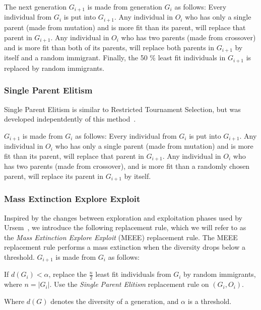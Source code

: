 The next generation $G_{i+1}$ is made from generation $G_i$ as follows:
Every individual from $G_i$ is put into $G_{i+1}$.
Any individual in $O_i$ who has only a single parent (made from mutation) and is more fit than its parent, will replace that parent in $G_{i+1}$.
Any individual in $O_i$ who has two parents (made from crossover) and is more fit than both of its parents, will replace both parents in $G_{i+1}$ by itself and a random immigrant.
Finally, the 50 \% least fit individuals in $G_{i+1}$ is replaced by random immigrants.


\subsubsection{Single Parent Elitism}
Single Parent Elitism is similar to Restricted Tournament Selection, but was developed indepentdently of this method~\cite[p. 132]{Luke2013Metaheuristics}.

$G_{i+1}$ is made from $G_i$ as follows:
Every individual from $G_i$ is put into $G_{i+1}$.
Any individual in $O_i$ who has only a single parent (made from mutation) and is more fit than its parent, will replace that parent in $G_{i+1}$.
Any individual in $O_i$ who has two parents (made from crossover), and is more fit than a randomly chosen parent, will replace its parent in $G_{i+1}$ by itself.

\subsubsection{Mass Extinction Explore Exploit}
Inspired by the changes between exploration and exploitation phases used by Ursem~\cite{ursem2002diversity}, we introduce the following replacement rule, which we will refer to as the \emph{Mass Extinction Explore Exploit} (MEEE) replacement rule.
The MEEE replacement rule performs a mass extinction when the diversity drops below a threshold.
$G_{i+1}$ is made from $G_i$ as follows:

If $d(G_i) < \alpha$, replace the $\frac{n}{2}$ least fit individuals from $G_i$ by random immigrants, where $n = \lvert G_i \rvert$.
Use the \emph{Single Parent Elitism} replacement rule on $(G_i, O_i)$.

Where $d(G)$ denotes the diversity of a generation, and $\alpha$ is a threshold. 


